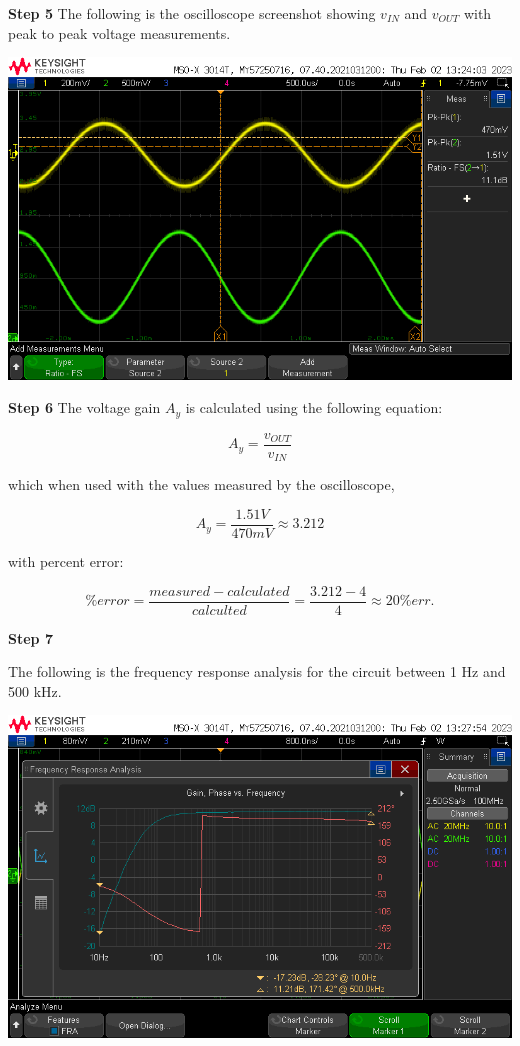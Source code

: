 \documentclass[notitlepage, 12pt]{report}  %
\begin{document}
\textbf{Step 5}
The following is the oscilloscope screenshot showing $v_{IN}$ and $v_{OUT}$ with peak to peak voltage measurements. \\

\begin{center}
    \includegraphics[scale=0.45]{scopeshot.png}
\end{center}

\textbf{Step 6}
The voltage gain $A_y$ is calculated using the following equation:

\begin{equation}
    A_y = \frac{v_{OUT}}{v_{IN}}
\end{equation}

which when used with the values measured by the oscilloscope, 

\begin{equation}
    A_y = \frac{1.51 V}{470 mV} \approx 3.212
\end{equation}

with percent error:

\begin{equation}
    \% error = \frac{measured - calculated}{calculted} = \frac{3.212 - 4}{4} \approx 20\% err.
\end{equation}


\textbf{Step 7}

The following is the frequency response analysis for the circuit between 1 Hz and 500 kHz. \\

\begin{center}
    \includegraphics[scale=0.5]{frc.png}
\end{center}
\end{document}
